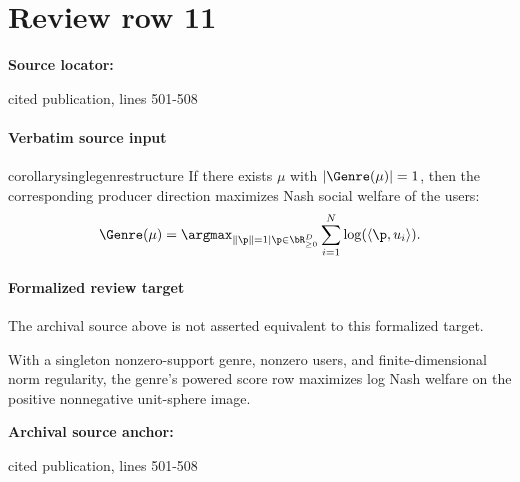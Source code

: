 \documentclass[10pt]{article}
\begin{document}
\section*{Review row 11}
\textbf{Source locator:} {\footnotesize\raggedright cited publication, lines 501-\allowbreak{}508\par}
\paragraph{Verbatim source input}
\begin{ReviewVerbatim}
\begin{restatable}{corollary}{singlegenrestructure}
\label{cor:singlegenrestructure}
If there exists $\mu$ with $|\Genre(\mu)| = 1$, then the corresponding producer direction maximizes Nash social welfare of the users:
\begin{equation}
\label{eq:direction}
 \Genre(\mu) = \argmax_{\|\p\|=1 \mid \p \in \bR_{\ge 0}^D} \sum_{i=1}^N \log(\langle \p, u_i\rangle).
\end{equation}
\end{restatable}
\end{ReviewVerbatim}


\paragraph{Formalized review target}
The archival source above is not asserted equivalent to this formalized target.
\begin{ReviewVerbatim}
With a singleton nonzero-support genre, nonzero users, and finite-dimensional norm regularity, the genre's powered score row maximizes log Nash welfare on the positive nonnegative unit-sphere image.
\end{ReviewVerbatim}

\textbf{Archival source anchor:} {\footnotesize\raggedright cited publication, lines 501-\allowbreak{}508\par}
\end{document}
